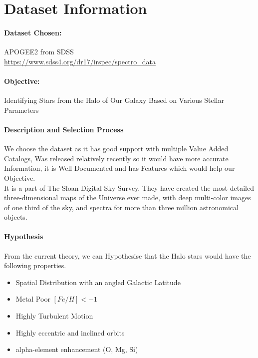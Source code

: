 \documentclass{article}
\begin{document}


\section{Dataset Information}\label{dataset-information}

\paragraph{Dataset Chosen:}
 APOGEE2 from SDSS\\
\url{https://www.sdss4.org/dr17/irspec/spectro_data}
\paragraph{Objective:}
Identifying Stars from the Halo of Our Galaxy Based on Various Stellar Parameters\\
\paragraph{Description and Selection Process}
We choose the dataset as it has good support with multiple Value Added Catalogs, Was released  relatively recently so it would have more accurate Information, it is Well Documented and has Features which would help our Objective.\\
It is a part of The Sloan Digital Sky Survey. They have created the most detailed three-dimensional maps of the Universe ever made, with deep multi-color images of one third of the sky, and spectra for more than three million astronomical objects.
\paragraph{Hypothesis}
From the current theory, we can Hypothesise that the Halo stars would have the following properties.
\begin{itemize}
  \item Spatial Distribution with an angled Galactic Latitude
  \item Metal Poor \([Fe/H] < −1\)
  \item Highly Turbulent Motion
  \item Highly eccentric and inclined orbits
  \item alpha-element enhancement (O, Mg, Si)

\end{itemize}
\newpage
\end{document}
